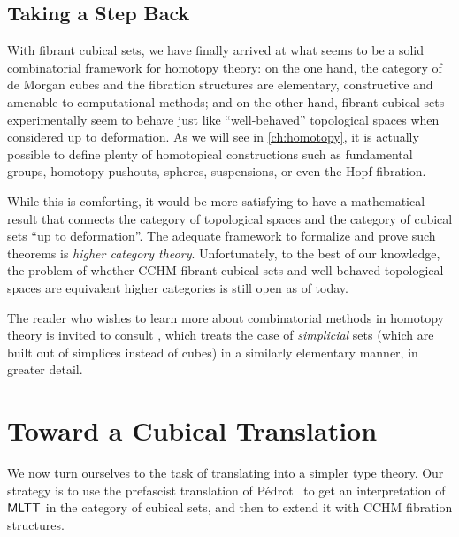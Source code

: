 

\subsection{Taking a Step Back}

With fibrant cubical sets, we have finally arrived at what seems to be a solid 
combinatorial framework for homotopy theory: 
% 
on the one hand, the category of de Morgan cubes and the fibration structures 
are elementary, constructive and amenable to computational methods;
% 
and on the other hand, fibrant cubical sets experimentally seem to behave just like 
``well-behaved'' topological spaces when considered up to deformation. As we
will see in \cref{ch:homotopy}, it is actually possible to define plenty of homotopical
constructions such as fundamental groups, homotopy pushouts, spheres, suspensions, 
or even the Hopf fibration.

While this is comforting, it would be more satisfying to have a mathematical 
result that connects the category of topological spaces and the category of
cubical sets ``up to deformation''. 
% 
The adequate framework to formalize and prove such theorems is \emph{higher 
category theory}. Unfortunately, to the best of our knowledge, the problem of 
whether CCHM-fibrant cubical sets and well-behaved topological spaces are 
equivalent higher categories is still open as of today.

The reader who wishes to learn more about combinatorial methods in homotopy 
theory is invited to consult , which treats the case 
of \emph{simplicial} sets (which are built out of simplices instead of cubes) in a 
similarly elementary manner, in greater detail.

\section{Toward a Cubical Translation}
\label{sec:cubical_trans}

We now turn ourselves to the task of translating 
into a simpler type theory.
% 
Our strategy is to use the prefascist translation of Pédrot~\cite{pedrot:prefascist}  
to get an interpretation of \( \mathsf{MLTT} \) in the category of cubical sets, and 
then to extend it with CCHM fibration structures.

